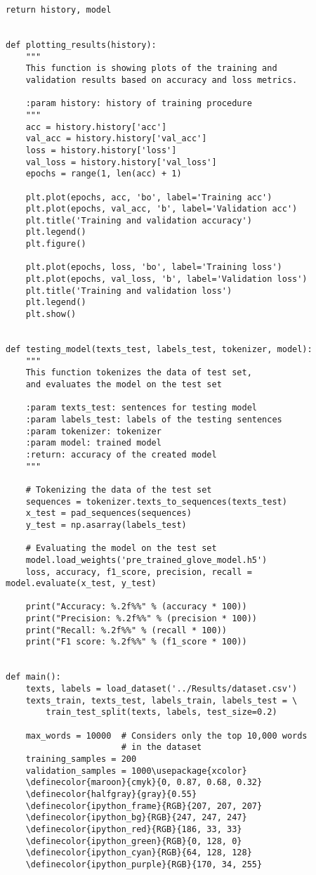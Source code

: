 \begin{lstlisting}[language=iPython]
	return history, model


def plotting_results(history):
	"""
	This function is showing plots of the training and 
	validation results based on accuracy and loss metrics.
	
	:param history: history of training procedure
	"""
	acc = history.history['acc']
	val_acc = history.history['val_acc']
	loss = history.history['loss']
	val_loss = history.history['val_loss']
	epochs = range(1, len(acc) + 1)
	
	plt.plot(epochs, acc, 'bo', label='Training acc')
	plt.plot(epochs, val_acc, 'b', label='Validation acc')
	plt.title('Training and validation accuracy')
	plt.legend()
	plt.figure()
	
	plt.plot(epochs, loss, 'bo', label='Training loss')
	plt.plot(epochs, val_loss, 'b', label='Validation loss')
	plt.title('Training and validation loss')
	plt.legend()
	plt.show()


def testing_model(texts_test, labels_test, tokenizer, model):
	"""
	This function tokenizes the data of test set,
	and evaluates the model on the test set
	
	:param texts_test: sentences for testing model
	:param labels_test: labels of the testing sentences
	:param tokenizer: tokenizer
	:param model: trained model
	:return: accuracy of the created model
	"""
	
	# Tokenizing the data of the test set
	sequences = tokenizer.texts_to_sequences(texts_test)
	x_test = pad_sequences(sequences)
	y_test = np.asarray(labels_test)
	
	# Evaluating the model on the test set
	model.load_weights('pre_trained_glove_model.h5')
	loss, accuracy, f1_score, precision, recall = model.evaluate(x_test, y_test)
	
	print("Accuracy: %.2f%%" % (accuracy * 100))
	print("Precision: %.2f%%" % (precision * 100))
	print("Recall: %.2f%%" % (recall * 100))
	print("F1 score: %.2f%%" % (f1_score * 100))


def main():
	texts, labels = load_dataset('../Results/dataset.csv')
	texts_train, texts_test, labels_train, labels_test = \
		train_test_split(texts, labels, test_size=0.2)
	
	max_words = 10000  # Considers only the top 10,000 words 
					   # in the dataset
	training_samples = 200
	validation_samples = 1000\usepackage{xcolor}
	\definecolor{maroon}{cmyk}{0, 0.87, 0.68, 0.32}
	\definecolor{halfgray}{gray}{0.55}
	\definecolor{ipython_frame}{RGB}{207, 207, 207}
	\definecolor{ipython_bg}{RGB}{247, 247, 247}
	\definecolor{ipython_red}{RGB}{186, 33, 33}
	\definecolor{ipython_green}{RGB}{0, 128, 0}
	\definecolor{ipython_cyan}{RGB}{64, 128, 128}
	\definecolor{ipython_purple}{RGB}{170, 34, 255}
	

\end{lstlisting}
